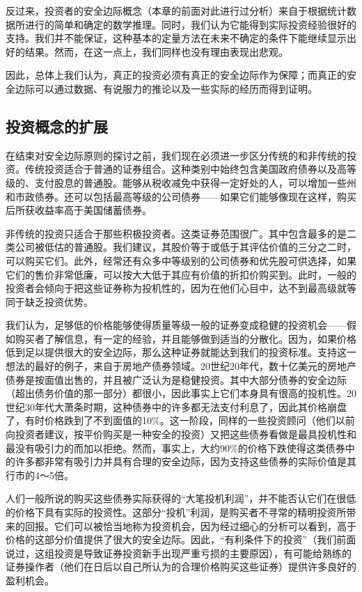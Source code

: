 \documentclass[12pt,oneside]{book}
\begin{document}
反过来，投资者的安全边际概念（本章的前面对此进行过分析）来自于根据统计数据所进行的简单和确定的数学推理。同时，我们认为它能得到实际投资经验很好的支持。我们并不能保证，这种基本的定量方法在未来不确定的条件下能继续显示出好的结果。然而，在这一点上，我们同样也没有理由表现出悲观。

因此，总体上我们认为，真正的投资必须有真正的安全边际作为保障；而真正的安全边际可以通过数据、有说服力的推论以及一些实际的经历而得到证明。

\subsection{投资概念的扩展}
在结束对安全边际原则的探讨之前，我们现在必须进一步区分传统的和非传统的投资。传统投资适合于普通的证券组合。这种类别中始终包含美国政府债券以及高等级的、支付股息的普通股。能够从税收减免中获得一定好处的人，可以增加一些州和市政债券。还可以包括最高等级的公司债券——如果它们能够像现在这样，购买后所获收益率高于美国储蓄债券。

非传统的投资只适合于那些积极投资者。这类证券范围很广。其中包含最多的是二类公司被低估的普通股。我们建议，其股价等于或低于其评估价值的三分之二时，可以购买它们。此外，经常还有众多中等级别的公司债券和优先股可供选择，如果它们的售价非常低廉，可以按大大低于其应有价值的折扣价购买到。此时，一般的投资者会倾向于把这些证券称为投机性的，因为在他们心目中，达不到最高级就等同于缺乏投资优势。

我们认为，足够低的价格能够使得质量等级一般的证券变成稳健的投资机会——假如购买者了解信息，有一定的经验，并且能够做到适当的分散化。因为，如果价格低到足以提供很大的安全边际，那么这种证券就能达到我们的投资标准。支持这一想法的最好的例子，来自于房地产债券领域。20世纪20年代，数十亿美元的房地产债券是按面值出售的，并且被广泛认为是稳健投资。其中大部分债券的安全边际（超出债务价值的那一部分）都很小，因此事实上它们本身具有很高的投机性。20世纪30年代大萧条时期，这种债券中的许多都无法支付利息了，因此其价格崩盘了，有时价格跌到了不到面值的10\%。这一阶段，同样的一些投资顾问（他们以前向投资者建议，按平价购买是一种安全的投资）又把这些债券看做是最具投机性和最没有吸引力的而加以拒绝。然而，事实上，大约90\%的价格下跌使得这类债券中的许多都非常有吸引力并具有合理的安全边际，因为支持这些债券的实际价值是其行市的4～5倍。

人们一般所说的购买这些债券实际获得的“大笔投机利润”，并不能否认它们在很低的价格下具有实际的投资性。这部分“投机”利润，是购买者不寻常的精明投资所带来的回报。它们可以被恰当地称为投资机会，因为经过细心的分析可以看到，高于价格的这部分价值提供了很大的安全边际。因此，“有利条件下的投资”（我们前面说过，这组投资是导致证券投资新手出现严重亏损的主要原因），有可能给熟练的证券操作者（他们在日后以自己所认为的合理价格购买这些证券）提供许多良好的盈利机会。
\end{document}
